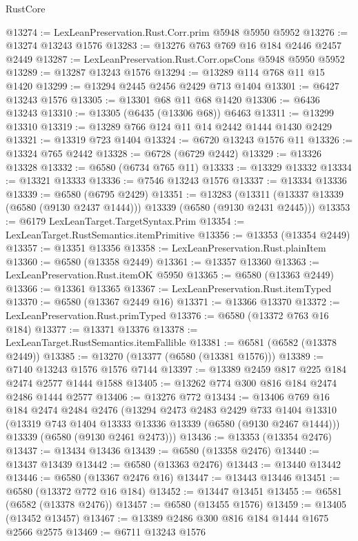 \begin{lexlean}{RustCore}
\begin{coremodule}
@13274 := LexLeanPreservation.Rust.Corr.prim @5948 @5950 @5952
@13276 := @13274 @13243 @1576
@13283 := @13276 @763 @769 @16 @184 @2446 @2457 @2449
@13287 := LexLeanPreservation.Rust.Corr.opsCons @5948 @5950 @5952
@13289 := @13287 @13243 @1576
@13294 := @13289 @114 @768 @11 @15 @1420
@13299 := @13294 @2445 @2456 @2429 @713 @1404
@13301 := @6427 @13243 @1576
@13305 := @13301 @68 @11 @68 @1420
@13306 := @6436 @13243
@13310 := @13305 (@6435 (@13306 @68)) @6463
@13311 := @13299 @13310
@13319 := @13289 @766 @124 @11 @14 @2442 @1444 @1430 @2429
@13321 := @13319 @723 @1404
@13324 := @6720 @13243 @1576 @11
@13326 := @13324 @765 @2442
@13328 := @6728 (@6729 @2442)
@13329 := @13326 @13328
@13332 := @6580 (@6734 @765 @11)
@13333 := @13329 @13332
@13334 := @13321 @13333
@13336 := @7546 @13243 @1576
@13337 := @13334 @13336
@13339 := @6580 (@6795 @2429)
@13351 := @13283
    (@13311 (@13337 @13339 (@6580 (@9130 @2437 @1444))) @13339 (@6580 (@9130 @2431 @2445)))
@13353 := @6179 LexLeanTarget.TargetSyntax.Prim
@13354 := LexLeanTarget.RustSemantics.itemPrimitive
@13356 := @13353 (@13354 @2449)
@13357 := @13351 @13356
@13358 := LexLeanPreservation.Rust.plainItem
@13360 := @6580 (@13358 @2449)
@13361 := @13357 @13360
@13363 := LexLeanPreservation.Rust.itemOK @5950
@13365 := @6580 (@13363 @2449)
@13366 := @13361 @13365
@13367 := LexLeanPreservation.Rust.itemTyped
@13370 := @6580 (@13367 @2449 @16)
@13371 := @13366 @13370
@13372 := LexLeanPreservation.Rust.primTyped
@13376 := @6580 (@13372 @763 @16 @184)
@13377 := @13371 @13376
@13378 := LexLeanTarget.RustSemantics.itemFallible
@13381 := @6581 (@6582 (@13378 @2449))
@13385 := @13270 (@13377 (@6580 (@13381 @1576)))
@13389 := @7140 @13243 @1576 @1576 @7144
@13397 := @13389 @2459 @817 @225 @184 @2474 @2577 @1444 @1588
@13405 := @13262 @774 @300 @816 @184 @2474 @2486 @1444 @2577
@13406 := @13276 @772
@13434 := @13406
    @769
    @16
    @184
    @2474
    @2484
    @2476
    (@13294
      @2473
      @2483
      @2429
      @733
      @1404
      @13310
      (@13319 @743 @1404 @13333 @13336 @13339 (@6580 (@9130 @2467 @1444)))
      @13339
      (@6580 (@9130 @2461 @2473)))
@13436 := @13353 (@13354 @2476)
@13437 := @13434 @13436
@13439 := @6580 (@13358 @2476)
@13440 := @13437 @13439
@13442 := @6580 (@13363 @2476)
@13443 := @13440 @13442
@13446 := @6580 (@13367 @2476 @16)
@13447 := @13443 @13446
@13451 := @6580 (@13372 @772 @16 @184)
@13452 := @13447 @13451
@13455 := @6581 (@6582 (@13378 @2476))
@13457 := @6580 (@13455 @1576)
@13459 := @13405 (@13452 @13457)
@13467 := @13389 @2486 @300 @816 @184 @1444 @1675 @2566 @2575
@13469 := @6711 @13243 @1576

\end{coremodule}
\end{lexlean}

